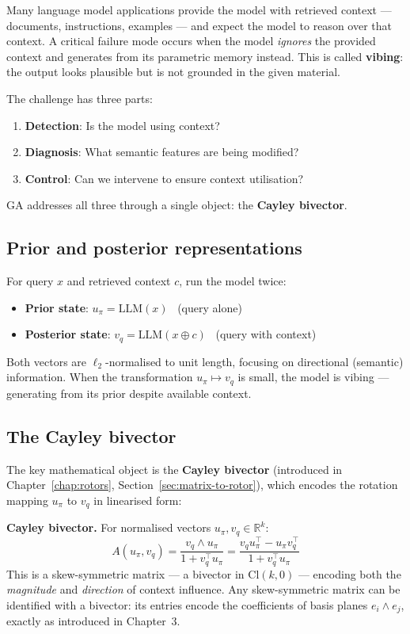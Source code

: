 \documentclass[11pt, twoside, openright]{memoir}
\newcommand{\op}{\wedge}          %
\numberwithin{equation}{chapter}
\begin{document}
Many language model applications provide the model with retrieved
context --- documents, instructions, examples --- and expect the
model to reason over that context.  A critical failure mode occurs
when the model \emph{ignores} the provided context and generates
from its parametric memory instead.  This is called \textbf{vibing}:
the output looks plausible but is not grounded in the given material.

The challenge has three parts:
\begin{enumerate}[nosep]
\item \textbf{Detection}: Is the model using context?
\item \textbf{Diagnosis}: What semantic features are being modified?
\item \textbf{Control}: Can we intervene to ensure context utilisation?
\end{enumerate}
GA addresses all three through a single object: the
\textbf{Cayley bivector}.

\subsection{Prior and posterior representations}

For query $x$ and retrieved context $c$, run the model twice:
\begin{itemize}[nosep]
\item \textbf{Prior state}: $u_\pi = \text{LLM}(x)$ \ (query alone)
\item \textbf{Posterior state}: $v_q = \text{LLM}(x \oplus c)$
  \ (query with context)
\end{itemize}
Both vectors are $\ell_2$-normalised to unit length, focusing on
directional (semantic) information.  When the transformation
$u_\pi \mapsto v_q$ is small, the model is vibing --- generating from
its prior despite available context.

\subsection{The Cayley bivector}

The key mathematical object is the \textbf{Cayley bivector}
(introduced in Chapter~\ref{chap:rotors},
Section~\ref{sec:matrix-to-rotor}), which encodes the rotation
mapping $u_\pi$ to $v_q$ in linearised form:

\begin{gabox}
\textbf{Cayley bivector.}
For normalised vectors $u_\pi, v_q \in \mathbb{R}^k$:
\begin{equation}
  A(u_\pi, v_q) = \frac{v_q \op u_\pi}{1 + v_q^\top u_\pi}
  = \frac{v_q u_\pi^\top - u_\pi v_q^\top}{1 + v_q^\top u_\pi}
\end{equation}
This is a skew-symmetric matrix --- a bivector in $\mathrm{Cl}(k, 0)$
--- encoding both the \emph{magnitude} and \emph{direction} of context
influence.
Any skew-symmetric matrix can be identified with a bivector: its entries encode the coefficients of basis planes $e_i \wedge e_j$, exactly as introduced in Chapter~3.
\end{gabox}
\end{document}
